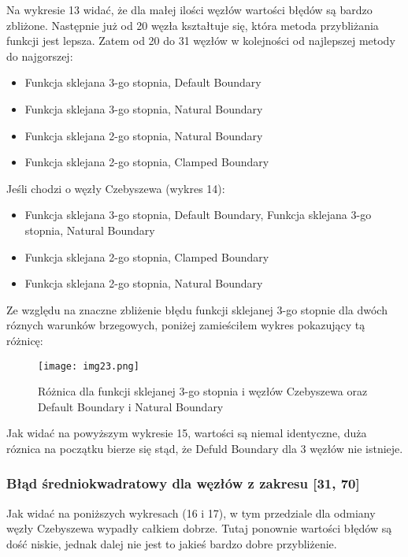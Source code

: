 \documentclass{article}
\begin{document}
Na wykresie 13 widać, że dla małej ilości węzłów wartości błędów są bardzo zbliżone. Następnie już od 20 węzła kształtuje się, która metoda przybliżania funkcji jest lepsza. Zatem od 20 do 31 węzłów w kolejności od najlepszej metody do najgorszej:

\begin{itemize}
    \item Funkcja sklejana 3-go stopnia, Default Boundary
    \item Funkcja sklejana 3-go stopnia, Natural Boundary
    \item Funkcja sklejana 2-go stopnia, Natural Boundary
    \item Funkcja sklejana 2-go stopnia, Clamped Boundary
\end{itemize}

\noindent
Jeśli chodzi o węzły Czebyszewa (wykres 14):
\begin{itemize}
\item Funkcja sklejana 3-go stopnia, Default Boundary, Funkcja sklejana 3-go stopnia, Natural Boundary
\item Funkcja sklejana 2-go stopnia, Clamped Boundary
\item Funkcja sklejana 2-go stopnia, Natural Boundary
\end{itemize}

Ze względu na znaczne zbliżenie błędu funkcji sklejanej 3-go stopnie dla dwóch róznych warunków brzegowych, poniżej zamieściłem wykres pokazujący tą różnicę:

\begin{figure}[H]
  \centering
  \begin{minipage}[b]{0.93\textwidth}
    \texttt{[image: img23.png]}
    \caption{Różnica dla funkcji sklejanej 3-go stopnia i węzłów Czebyszewa oraz Default Boundary i Natural Boundary}
  \end{minipage}
\end{figure}

\noindent
Jak widać na powyższym wykresie 15, wartości są niemal identyczne, duża róznica na początku bierze się stąd, że Defuld Boundary dla 3 węzłów nie istnieje.

\subsubsection{Błąd średniokwadratowy dla węzłów z zakresu [31, 70]}

Jak widać na poniższych wykresach (16 i 17), w tym przedziale dla odmiany węzły Czebyszewa wypadły całkiem dobrze. Tutaj ponownie wartości błędów są dość niskie, jednak dalej nie jest to jakieś bardzo dobre przybliżenie.
\end{document}
